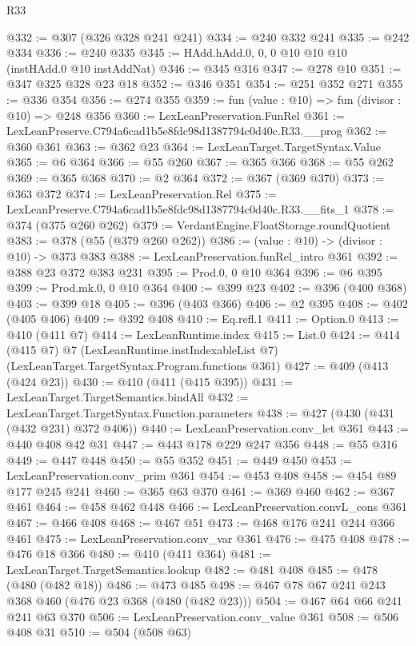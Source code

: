 \begin{lexlean}{R33}
\begin{coremodule}
@332 := @307 (@326 @328 @241 @241)
@334 := @240 @332 @241
@335 := @242 @334
@336 := @240 @335
@345 := HAdd.hAdd.{0, 0, 0} @10 @10 @10 (instHAdd.{0} @10 instAddNat)
@346 := @345 @316
@347 := @278 @10
@351 := @347 @325 @328 @23 @18
@352 := @346 @351
@354 := @251 @352 @271
@355 := @336 @354
@356 := @274 @355
@359 := fun (value : @10) => fun (divisor : @10) => @248 @356
@360 := LexLeanPreservation.FunRel
@361 := LexLeanPreserve.C794a6cad1b5e8fdc98d1387794c0d40c.R33.__prog
@362 := @360 @361
@363 := @362 @23
@364 := LexLeanTarget.TargetSyntax.Value
@365 := @6 @364
@366 := @55 @260
@367 := @365 @366
@368 := @55 @262
@369 := @365 @368
@370 := @2 @364
@372 := @367 (@369 @370)
@373 := @363 @372
@374 := LexLeanPreservation.Rel
@375 := LexLeanPreserve.C794a6cad1b5e8fdc98d1387794c0d40c.R33.__fits_1
@378 := @374 (@375 @260 @262)
@379 := VerdantEngine.FloatStorage.roundQuotient
@383 := @378 (@55 (@379 @260 @262))
@386 := (value : @10) -> (divisor : @10) -> @373 @383
@388 := LexLeanPreservation.funRel_intro @361
@392 := @388 @23 @372 @383 @231
@395 := Prod.{0, 0} @10 @364
@396 := @6 @395
@399 := Prod.mk.{0, 0} @10 @364
@400 := @399 @23
@402 := @396 (@400 @368)
@403 := @399 @18
@405 := @396 (@403 @366)
@406 := @2 @395
@408 := @402 (@405 @406)
@409 := @392 @408
@410 := Eq.refl.{1}
@411 := Option.{0}
@413 := @410 (@411 @7)
@414 := LexLeanRuntime.index
@415 := List.{0}
@424 := @414
    (@415 @7)
    @7
    (LexLeanRuntime.instIndexableList @7)
    (LexLeanTarget.TargetSyntax.Program.functions @361)
@427 := @409 (@413 (@424 @23))
@430 := @410 (@411 (@415 @395))
@431 := LexLeanTarget.TargetSemantics.bindAll
@432 := LexLeanTarget.TargetSyntax.Function.parameters
@438 := @427 (@430 (@431 (@432 @231) @372 @406))
@440 := LexLeanPreservation.conv_let @361
@443 := @440 @408 @42 @31
@447 := @443 @178 @229 @247 @356
@448 := @55 @316
@449 := @447 @448
@450 := @55 @352
@451 := @449 @450
@453 := LexLeanPreservation.conv_prim @361
@454 := @453 @408
@458 := @454 @89 @177 @245 @241
@460 := @365 @63 @370
@461 := @369 @460
@462 := @367 @461
@464 := @458 @462 @448
@466 := LexLeanPreservation.convL_cons @361
@467 := @466 @408
@468 := @467 @51
@473 := @468 @176 @241 @244 @366 @461
@475 := LexLeanPreservation.conv_var @361
@476 := @475 @408
@478 := @476 @18 @366
@480 := @410 (@411 @364)
@481 := LexLeanTarget.TargetSemantics.lookup
@482 := @481 @408
@485 := @478 (@480 (@482 @18))
@486 := @473 @485
@498 := @467 @78 @67 @241 @243 @368 @460 (@476 @23 @368 (@480 (@482 @23)))
@504 := @467 @64 @66 @241 @241 @63 @370
@506 := LexLeanPreservation.conv_value @361
@508 := @506 @408 @31
@510 := @504 (@508 @63)

\end{coremodule}
\end{lexlean}
